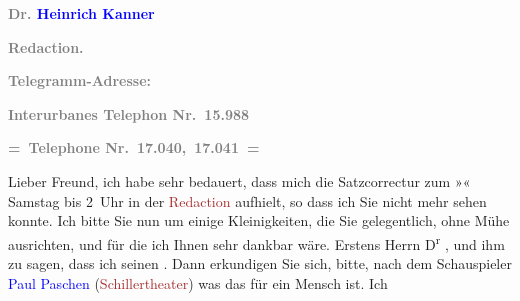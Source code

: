 \pstart
           \textcolor{gray}{\textbf{\textbf{Dr. \textcolor{blue}{Heinrich Kanner}{}\ledrightnote{\textcolor{blue}{Heinrich Kanner}}}}}\pend
           
\pstart
           \textcolor{gray}{\textbf{\textbf{Redaction.}}}\pend
           
\pstart
           \textcolor{gray}{\textbf{Telegramm-Adresse: \textcolor{brown}{}{}\ledrightnote{\textcolor{brown}{Die Zeit}}\so{,}{ }\textcolor{pink}{}{}\ledrightnote{\textcolor{pink}{Wien}}}}\pend
           
\pstart
           \textcolor{gray}{\textbf{Interurbanes Telephon Nr. 15.988}}\pend
           
\pstart
           \textcolor{gray}{\textbf{= Telephone Nr. 17.040, 17.041 =}}\pend
           
\pstart
           Lieber Freund, ich habe sehr bedauert, dass mich die
               Satzcorrectur zum »\label{K_L03335-1v}\label{K_L03335-1h}« Samstag bis
                  2 Uhr in der \textcolor{pink}{\textcolor{brown}{Redaction}{}\ledrightnote{{$\rightarrow$}\textcolor{brown}{Die Zeit}}}{}\ledrightnote{{$\rightarrow$}\textcolor{pink}{Wipplingerstraße}} aufhielt, so dass ich Sie nicht mehr sehen konnte. Ich bitte Sie nun um einige
               Kleinigkeiten, die Sie gelegentlich, ohne Mühe ausrichten, und für die ich Ihnen sehr
               dankbar wäre. Erstens Herrn D\textsuperscript{r}{ }\label{K_L03335-2v}\label{K_L03335-2h},
               und ihm zu sagen, dass ich seinen \label{K_L03335-3v}\label{K_L03335-3h}. Dann erkundigen Sie sich, bitte,
               nach dem Schauspieler \textcolor{blue}{Paul Paschen}{}\ledrightnote{\textcolor{blue}{Paul Paschen}} (\textcolor{brown}{Schillertheater}{}\ledrightnote{\textcolor{brown}{Schiller-Theater}}) was das für ein Mensch ist. Ich
